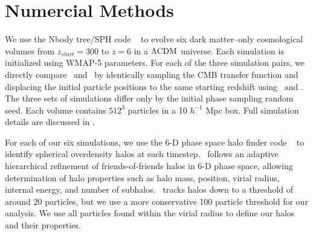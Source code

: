 
%
%

\section{Numercial Methods}
\label{sec:methods}






We use the Nbody tree/SPH code \gadgettwo\ \citep{2001NewA....6...79S, 2005MNRAS.364.1105S} to evolve six dark matter--only cosmological volumes from $z_{start} = 300$ to $z = 6$ in a $\rm \Lambda CDM$ universe.  Each simulation is initialized using WMAP-5 parameters.  For each of the three simulation pairs, we directly compare \lpt\ and \za\ by identically sampling the CMB transfer function and displacing the initial particle positions to the same starting redshift using \lpt\ and \za.  The three sets of simulations differ only by the initial phase sampling random seed.  Each volume contains $512^{3}$ particles in a 10 $h^{-1}$ Mpc box.  Full simulation details are discussed in \citet{2012ApJ...761L...8H}.






For each of our six simulations, we use the 6-D phase space halo finder code \rockstar\ \citep{2013ApJ...762..109B} to identify spherical overdensity halos at each timestep.  \rockstar\ follows an adaptive hierarchical refinement of friends-of-friends halos in 6-D phase space, allowing determination of halo properties such as halo mass, position, virial radius, internal energy, and number of subhalos.  \rockstar\ tracks halos down to a threshold of around 20 particles, but we use a more conservative 100 particle threshold for our analysis.  We use all particles found within the virial radius to define our halos and their properties.




